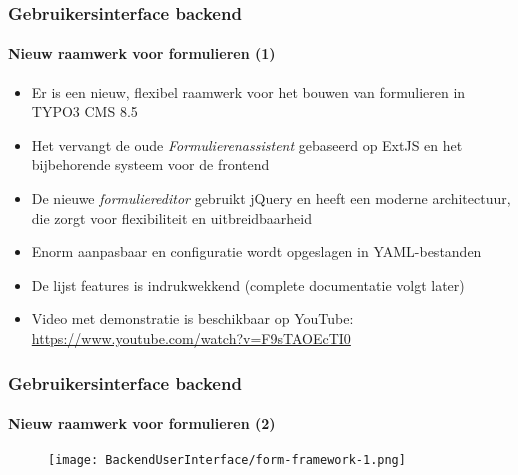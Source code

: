 \begin{frame}[fragile]
	\frametitle{Gebruikersinterface backend}
	\framesubtitle{Nieuw raamwerk voor formulieren (1)}

	\begin{itemize}
		\item Er is een nieuw, flexibel raamwerk voor het bouwen van formulieren in TYPO3 CMS 8.5
		\item Het vervangt de oude \textit{Formulierenassistent} gebaseerd op ExtJS en het bijbehorende systeem voor de frontend
		\item De nieuwe \textit{formuliereditor} gebruikt jQuery en heeft een moderne architectuur,
			die zorgt voor flexibiliteit en uitbreidbaarheid
		\item Enorm aanpasbaar en configuratie wordt opgeslagen in YAML-bestanden
		\item De lijst features is indrukwekkend\newline
			\small(complete documentatie volgt later)\normalsize
		\item Video met demonstratie is beschikbaar op YouTube:\newline
			\url{https://www.youtube.com/watch?v=F9sTAOEcTI0}
	\end{itemize}

\end{frame}
\begin{frame}[fragile]
	\frametitle{Gebruikersinterface backend}
	\framesubtitle{Nieuw raamwerk voor formulieren (2)}

	\begin{figure}
		\texttt{[image: BackendUserInterface/form-framework-1.png]}
	\end{figure}

\end{frame}

